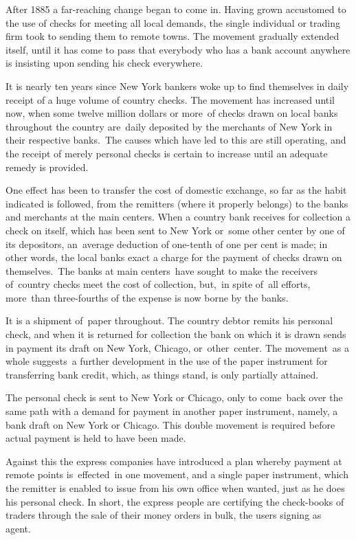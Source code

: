 \documentclass[openany,nobib]{tufte-book}
\begin{document}
After 1885 a far-reaching change began to come in. Having grown
accustomed to the use of checks for meeting all local demands, the
single individual or trading firm took to sending them to remote towns.
The movement gradually extended itself, until it has come to pass that
everybody who has a bank account anywhere is insisting upon sending his
check everywhere. ~

It is nearly ten years since New York bankers woke up to find themselves
in daily receipt of a huge volume of country checks. The movement has
increased until now, when some twelve million dollars or more~of checks
drawn on local banks throughout the country are~daily deposited by the
merchants of New York in their respective banks.~The causes which have
led to this are still operating, and the receipt of merely personal
checks is certain to increase until an adequate remedy is provided.~

One effect has been to transfer the cost of domestic exchange, so far as
the habit indicated is followed, from the remitters (where it properly
belongs) to the banks and merchants at the main centers. When a country
bank receives for collection a check on itself, which has been sent to
New York or~some other center by one of its depositors, an~average
deduction of one-tenth of one per cent is made; in other words, the
local banks exact a charge for the payment of checks drawn on
themselves.~The banks at main centers~have sought to make the receivers
of~country checks meet the cost of collection, but,~in spite of~all
efforts, more~than three-fourths of the expense is now borne by the
banks.~~~

It is a shipment of~paper throughout. The country debtor remits his
personal check, and when it is returned for collection the bank on which
it is drawn sends in payment its draft on New York, Chicago,
or~other~center. The movement~as a whole suggests~a further development
in the use of the paper instrument for transferring bank credit, which,
as things stand, is only partially attained. ~

The personal check is sent to New York or Chicago, only to come~back
over the same path with a demand for payment in another paper
instrument, namely, a bank draft on New York or Chicago. This double
movement is required before actual payment is held to have been made.~

Against this the express companies have introduced a plan whereby
payment at remote points is~effected~in one movement, and a single paper
instrument, which the remitter is enabled to issue from his own office
when wanted, just as he does his personal check. In short, the express
people are certifying the check-books of traders through the sale of
their money orders in bulk, the users signing as agent.~
\end{document}
